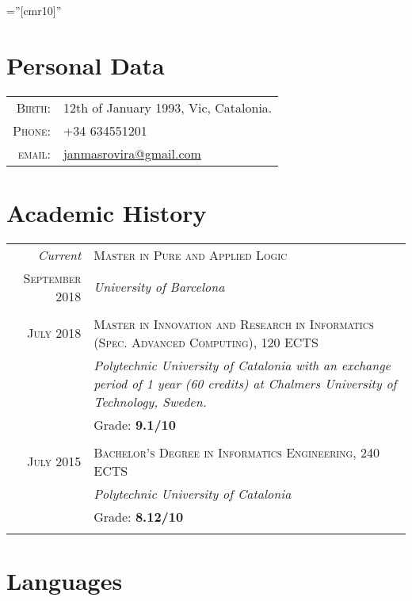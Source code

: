 \documentclass[a4paper,10pt]{article}
\begin{document}
\pagestyle{empty}

\font\fb=''[cmr10]''

\par{\bigskip\par}

\section{Personal Data}

\begin{tabular}{rl}
\textsc{Birth:} & 12th of January 1993, Vic, Catalonia.\\
\textsc{Phone:} & +34 634551201\\
\textsc{email:} & \href{mailto:janmasrovira@gmail.com}{janmasrovira@gmail.com}
\end{tabular}

\section{Academic History}

\begin{tabular}{r|p{11cm}}
\emph{Current} & \textsc{Master in Pure and Applied Logic} \\
\textsc{September 2018} & \emph{University of Barcelona}\\
\multicolumn{2}{c}{} \\

  \textsc{July 2018} & \textsc{Master in Innovation and Research in Informatics (Spec. Advanced Computing), 120 ECTS} \\
               & \emph{Polytechnic University of Catalonia with an exchange period of 1 year (60 credits) at Chalmers University of Technology, Sweden.}\\
  & Grade: \textbf{9.1/10} \\
  \multicolumn{2}{c}{} \\

  \textsc{July 2015} & \textsc{Bachelor's Degree in Informatics Engineering, 240 ECTS} \\
               & \emph{Polytechnic University of Catalonia}\\
               & Grade: \textbf{8.12/10} \\
  \multicolumn{2}{c}{} \\
\end{tabular}

\section{Languages}
\end{document}
